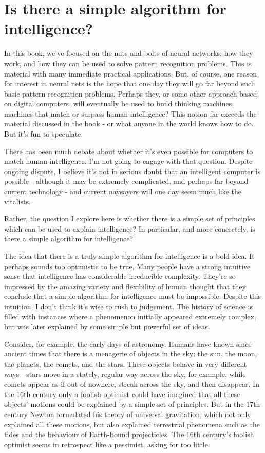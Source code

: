 \documentclass[a4paper,twoside,10pt]{book}
\begin{document}
\chapter{Is there a simple algorithm for intelligence?}
In this book, we've focused on the nuts and bolts of neural networks: how they work, and how they can be used to solve pattern recognition problems. This is material with many immediate practical applications. But, of course, one reason for interest in neural nets is the hope that one day they will go far beyond such basic pattern recognition problems. Perhaps they, or some other approach based on digital computers, will eventually be used to build thinking machines, machines that match or surpass human intelligence? This notion far exceeds the material discussed in the book - or what anyone in the world knows how to do. But it's fun to speculate.

There has been much debate about whether it's even possible for computers to match human intelligence. I'm not going to engage with that question. Despite ongoing dispute, I believe it's not in serious doubt that an intelligent computer is possible - although it may be extremely complicated, and perhaps far beyond current technology - and current naysayers will one day seem much like the vitalists.

Rather, the question I explore here is whether there is a simple set of principles which can be used to explain intelligence? In particular, and more concretely, is there a simple algorithm for intelligence?

The idea that there is a truly simple algorithm for intelligence is a bold idea. It perhaps sounds too optimistic to be true. Many people have a strong intuitive sense that intelligence has considerable irreducible complexity. They're so impressed by the amazing variety and flexibility of human thought that they conclude that a simple algorithm for intelligence must be impossible. Despite this intuition, I don't think it's wise to rush to judgement. The history of science is filled with instances where a phenomenon initially appeared extremely complex, but was later explained by some simple but powerful set of ideas.

Consider, for example, the early days of astronomy. Humans have known since ancient times that there is a menagerie of objects in the sky: the sun, the moon, the planets, the comets, and the stars. These objects behave in very different ways - stars move in a stately, regular way across the sky, for example, while comets appear as if out of nowhere, streak across the sky, and then disappear. In the 16th century only a foolish optimist could have imagined that all these objects' motions could be explained by a simple set of principles. But in the 17th century Newton formulated his theory of universal gravitation, which not only explained all these motions, but also explained terrestrial phenomena such as the tides and the behaviour of Earth-bound projecticles. The 16th century's foolish optimist seems in retrospect like a pessimist, asking for too little.
\end{document}
